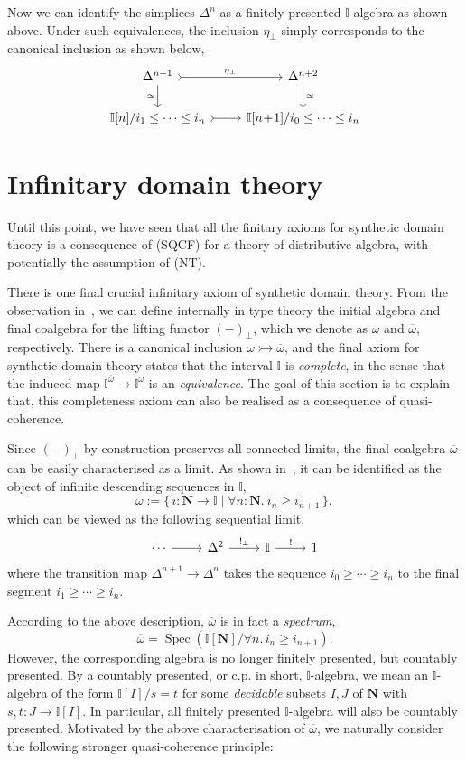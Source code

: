 \documentclass[12pt]{amsart}
\theoremstyle{definition}
\newcommand{\mb}[1]{\mathbf{#1}}
\newcommand{\mbb}[1]{\mathbb{#1}}
\newcommand{\I}{\mbb I}
\newcommand{\ov}[1]{\overline{#1}}
\newcommand{\scomp}[2]{\{\,#1\mid#2\,\}}
\newcommand{\inj}{\rightarrowtail}
\newcommand{\N}{\mb N}
\newcommand{\prt}{_{\bot}}
\newcommand{\fa}[2]{\forall #1\!\colon\!\!#2.\ }
\newcommand{\spec}{\operatorname{Spec}}
\begin{document}
Now we can identify the simplices $\Delta^n$ as a finitely presented $\I$-algebra as shown above. Under such equivalences, the inclusion $\eta\prt$ simply corresponds to the canonical inclusion as shown below,
\[
  \begin{tikzcd}
    \Delta^{n+1} \ar[r, tail, "\eta\prt"] \ar[d, "\simeq"'] & \Delta^{n+2}  \ar[d, "\simeq"] \\ 
    \I[n]/i_1 \le \cdots \le i_n \ar[r, tail] & \I[n\!+\!1]/i_0 \le \cdots \le i_{n} 
  \end{tikzcd}
\]

\section{Infinitary domain theory}\label{sec:infdomain}

Until this point, we have seen that all the finitary axioms for synthetic domain theory is a consequence of (SQCF) for a theory of distributive algebra, with potentially the assumption of (NT).

There is one final crucial infinitary axiom of synthetic domain theory. From the observation in~\cite{hyland2006first,JIBLADZE1997185}, we can define internally in type theory the initial algebra and final coalgebra for the lifting functor $(-)\prt$, which we denote as $\omega$ and $\ov\omega$, respectively. There is a canonical inclusion $\omega \inj \ov\omega$, and the final axiom for synthetic domain theory states that the interval $\I$ is \emph{complete}, in the sense that the induced map $\I^{\ov\omega} \to \I^\omega$ is an \emph{equivalence}. The goal of this section is to explain that, this completeness axiom can also be realised as a consequence of quasi-coherence.

Since $(-)\prt$ by construction preserves all connected limits, the final coalgebra $\ov\omega$ can be easily characterised as a limit. As shown in~\cite{hyland2006first}, it can be identified as the object of infinite descending sequences in $\I$,
\[ \ov\omega := \scomp{i : \N \to \I}{\fa n\N i_n \ge i_{n+1}}, \]
which can be viewed as the following sequential limit,
\[
\begin{tikzcd}
  \cdots \ar[r] & \Delta^2 \ar[r, "!\prt"] & \I \ar[r, "!"] & 1
\end{tikzcd}
\]
where the transition map $\Delta^{n+1} \to \Delta^n$ takes the sequence $i_0 \ge \cdots \ge i_n$ to the final segment $i_1 \ge \cdots \ge i_n$. 

According to the above description, $\ov\omega$ is in fact a \emph{spectrum},
\[ \ov\omega = \spec(\I[\N]/\forall n.\, i_n \ge i_{n+1}). \]
However, the corresponding algebra is no longer finitely presented, but countably presented. By a countably presented, or c.p. in short, $\I$-algebra, we mean an $\I$-algebra of the form $\I[I]/s=t$ for some \emph{decidable} subsets $I,J$ of $\N$ with $s,t : J \to \I[I]$. In particular, all finitely presented $\I$-algebra will also be countably presented. Motivated by the above characterisation of $\ov\omega$, we naturally consider the following stronger quasi-coherence principle:
\end{document}
